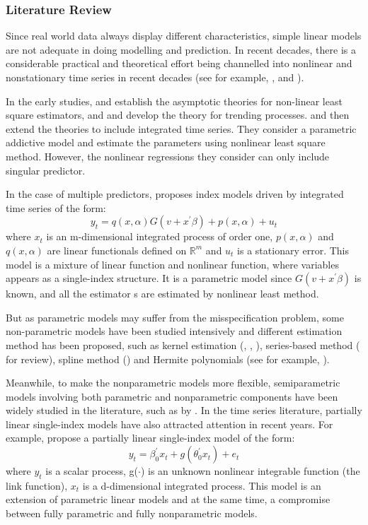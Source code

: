 \documentclass[a4paper,12pt,times,numbered,print,index]{report}
\numberwithin{equation}{section}
\begin{document}
\subsubsection{Literature Review}
Since real world data always display different characteristics, simple linear models are not adequate in doing modelling and prediction. In recent decades, there is a considerable practical and theoretical effort being channelled into nonlinear and nonstationary time series in recent decades (see for example, \cite{park2001nonlinear}, \cite{park2002nonstationary} and \cite{gao2009nonparametric}). 

In the early studies, \cite{jennrich1969asymptotic} and \cite{wu1981asymptotic} establish the asymptotic theories for non-linear least square estimators, and \cite{wooldridge1994estimation} and \cite{andrews1995nonlinear} develop the theory for trending processes. \cite{park2001nonlinear} and \cite{chang2001nonlinear} then extend the theories to include integrated time series. They consider a parametric addictive model and estimate the parameters using nonlinear least square method. However, the nonlinear regressions they consider can only include singular predictor. 

In the case of multiple predictors, \cite{chang2003index} proposes index models driven by integrated time series of the form:
$$
    y_t = q(x,\alpha)G(v+x^{\prime}\beta) + p(x,\alpha) + u_t
$$
where $x_t$ is an m-dimensional integrated process of order one, $p(x,\alpha)$ and $q(x,\alpha)$ are linear functionals defined on $\mathbb{R}^{m}$ and $u_t$ is a stationary error. This model is a mixture of linear function and nonlinear function, where variables appears as a single-index structure. It is a parametric model since $G(v+x^{\prime}\beta)$ is known, and  all the estimator s are estimated by nonlinear least method.

But as parametric models may suffer from the misspecification problem, some non-parametric models have been studied intensively and different estimation method has been proposed, such as kernel estimation (\cite{xia2006semi}, \cite{ma2015varying}, \cite{birke2017semi}), series-based method (\cite{chen2007large} for review), spline method (\cite{yu2002penalized}) and Hermite polynomials (see for example, \cite{dong2015semiparametric}). 

Meanwhile, to make the nonparametric models more flexible, semiparametric models involving both parametric and nonparametric components have been widely studied in the literature, such as by \cite{gao2007nonlinear}. In the time series literature, partially linear single-index models have also attracted attention in recent years. For example, \cite{dong2016estimation} propose a partially linear single-index model of the form:
\begin{equation}
    y_t = \beta_0^{\prime}x_t+g(\theta_0^{\prime} x_t) + e_t
    \label{Dong_model}
\end{equation}
where $y_t$ is a scalar process, g($\cdot$) is an unknown nonlinear integrable function (the link function), $x_t$ is a d-dimensional integrated process. This model is an extension of parametric linear models and at the same time, a compromise between fully parametric and fully nonparametric models. 
\end{document}
